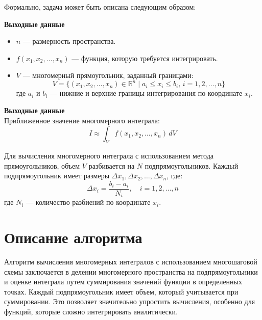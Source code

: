 \documentclass[12pt]{article}
\begin{document}
Формально, задача может быть описана следующим образом:

\vspace{0.5 cm}

\textbf{Выходные данные}
\begin{itemize}
    \item $n$ — размерность пространства.
    \item $f(x_1, x_2, \ldots, x_n)$ — функция, которую требуется интегрировать.
    \item $V$ — многомерный прямоугольник, заданный границами:
    \[
    V = \{(x_1, x_2, \ldots, x_n) \in \mathbb{R}^n \mid a_i \leq x_i \leq b_i, \, i = 1, 2, \ldots, n\}
    \]
    где $a_i$ и $b_i$ — нижние и верхние границы интегрирования по координате $x_i$.
\end{itemize}

\vspace{0.5 cm}

\textbf{Выходные данные} \\
    Приближенное значение многомерного интеграла:
\[
I \approx \int_V f(x_1, x_2, \ldots, x_n) \, dV
\]

Для вычисления многомерного интеграла с использованием метода прямоугольников, объем $V$ разбивается на $N$ подпрямоугольников. Каждый подпрямоугольник имеет размеры $\Delta x_1, \Delta x_2, \ldots, \Delta x_n$, где:
\[
\Delta x_i = \frac{b_i - a_i}{N_i}, \quad i = 1, 2, \ldots, n
\]
где $N_i$ — количество разбиений по координате $x_i$.

\newpage

\section{Описание алгоритма}
Алгоритм вычисления многомерных интегралов с использованием многошаговой схемы  заключается в делении многомерного пространства на подпрямоугольники и оценке интеграла путем суммирования значений функции в определенных точках. Каждый подпрямоугольник имеет объем, который учитывается при суммировании. Это позволяет значительно упростить вычисления, особенно для функций, которые сложно интегрировать аналитически.\\
\end{document}
